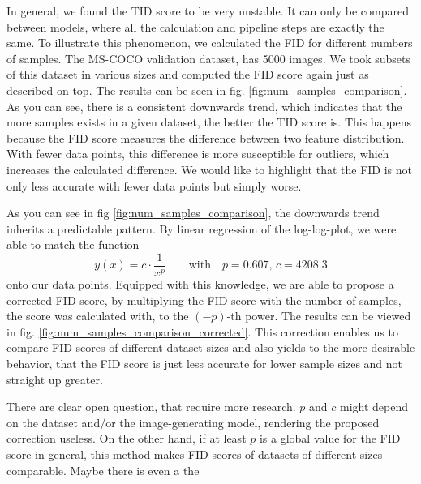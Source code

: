 \documentclass[11pt]{article}
\begin{document}
In general, we found the TID score to be very unstable. It can only be compared between models, where all the calculation and pipeline steps are exactly the same. To illustrate this phenomenon, we calculated the FID for different numbers of samples. The MS-COCO validation dataset, has 5000 images. We took subsets of this dataset in various sizes and computed the FID score again just as described on top. The results can be seen in fig. \ref{fig:num_samples_comparison}. As you can see, there is a consistent downwards trend, which indicates that the more samples exists in a given dataset, the better the TID score is. This happens because the FID score measures the difference between two feature distribution. With fewer data points, this difference is more susceptible for outliers, which increases the calculated difference. We would like to highlight that the FID is not only less accurate with fewer data points but simply worse.

As you can see in fig \ref{fig:num_samples_comparison}, the downwards trend inherits a predictable pattern. By linear regression of the log-log-plot, we were able to match the function
$$ y(x) = c\cdot \frac{1}{x^p} \qquad\mathrm{with}\quad p = 0.607,\, c = 4208.3$$
onto our data points. Equipped with this knowledge, we are able to propose a corrected FID score, by multiplying the FID score with the number of samples, the score was calculated with, to the $(-p)$-th power. The results can be viewed in fig. \ref{fig:num_samples_comparison_corrected}. This correction enables us to compare FID scores of different dataset sizes and also yields to the more desirable behavior, that the FID score is just less accurate for lower sample sizes and not straight up greater.

There are clear open question, that require more research. $p$ and $c$ might depend on the dataset and/or the image-generating model, rendering the proposed correction useless. On the other hand, if at least $p$ is a global value for the FID score in general, this method makes FID scores of datasets of different sizes comparable. Maybe there is even a the
\end{document}
